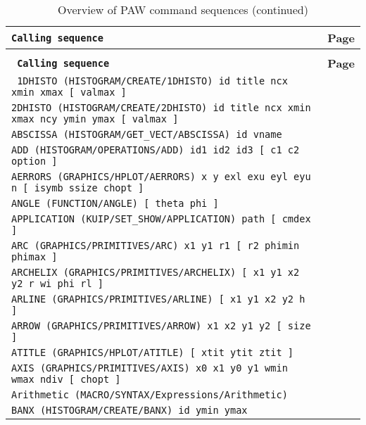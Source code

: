 \begin{longtable}{|>{\footnotesize\tt}lr|}
\caption[Alphabetical list of PAW commands]{Alphabetical list of PAW commands\label{tab:pawcom}}\\
\hline
\rm\bf Calling sequence      & \bf Page \\
\hline
\endfirsthead
\caption[]{Overview of PAW command sequences (continued)}\\
\hline
\rm\bf Calling sequence      & \bf Page \\
\hline
\endhead
\hline
\endfoot
1DHISTO (HISTOGRAM/CREATE/1DHISTO)  id title ncx xmin xmax [ valmax ] & \pageref{ref:HISTOGRAM/CREATE/1DHISTO}\\ 
2DHISTO (HISTOGRAM/CREATE/2DHISTO)  id title ncx xmin xmax ncy ymin ymax [ valmax ] & \pageref{ref:HISTOGRAM/CREATE/2DHISTO}\\ 
ABSCISSA (HISTOGRAM/GET_VECT/ABSCISSA)  id vname & \pageref{ref:HISTOGRAM/GET_VECT/ABSCISSA}\\ 
ADD (HISTOGRAM/OPERATIONS/ADD)  id1 id2 id3 [ c1 c2 option ] & \pageref{ref:HISTOGRAM/OPERATIONS/ADD}\\ 
AERRORS (GRAPHICS/HPLOT/AERRORS)  x y exl exu eyl eyu n [ isymb ssize chopt ] & \pageref{ref:GRAPHICS/HPLOT/AERRORS}\\ 
ANGLE (FUNCTION/ANGLE)  [ theta phi ] & \pageref{ref:FUNCTION/ANGLE}\\ 
APPLICATION (KUIP/SET_SHOW/APPLICATION)  path [ cmdex ] & \pageref{ref:KUIP/SET_SHOW/APPLICATION}\\ 
ARC (GRAPHICS/PRIMITIVES/ARC)  x1 y1 r1 [ r2 phimin phimax ] & \pageref{ref:GRAPHICS/PRIMITIVES/ARC}\\ 
ARCHELIX (GRAPHICS/PRIMITIVES/ARCHELIX)  [ x1 y1 x2 y2 r wi phi rl ] & \pageref{ref:GRAPHICS/PRIMITIVES/ARCHELIX}\\ 
ARLINE (GRAPHICS/PRIMITIVES/ARLINE)  [ x1 y1 x2 y2 h ] & \pageref{ref:GRAPHICS/PRIMITIVES/ARLINE}\\ 
ARROW (GRAPHICS/PRIMITIVES/ARROW)  x1 x2 y1 y2 [ size ] & \pageref{ref:GRAPHICS/PRIMITIVES/ARROW}\\ 
ATITLE (GRAPHICS/HPLOT/ATITLE)  [ xtit ytit ztit ] & \pageref{ref:GRAPHICS/HPLOT/ATITLE}\\ 
AXIS (GRAPHICS/PRIMITIVES/AXIS)  x0 x1 y0 y1 wmin wmax ndiv [ chopt ] & \pageref{ref:GRAPHICS/PRIMITIVES/AXIS}\\ 
Arithmetic (MACRO/SYNTAX/Expressions/Arithmetic)  & \pageref{ref:MACRO/SYNTAX/Expressions/Arithmetic}\\ 
BANX (HISTOGRAM/CREATE/BANX)  id ymin ymax & \pageref{ref:HISTOGRAM/CREATE/BANX}\\ 

\end{longtable}
